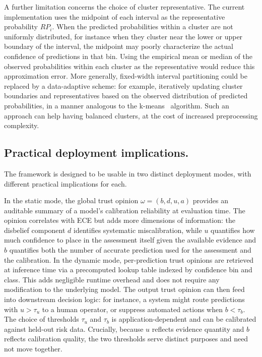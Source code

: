 A further limitation concerns the choice of cluster representative. The current implementation uses the midpoint of each interval as the representative probability $RP_i$. When the predicted probabilities within a cluster are not uniformly distributed, for instance when they cluster near the lower or upper boundary of the interval, the midpoint may poorly characterize the actual confidence of predictions in that bin. Using the empirical mean or median of the observed probabilities within each cluster as the representative would reduce this approximation error. More generally, fixed-width interval partitioning could be replaced by a data-adaptive scheme: for example, iteratively updating cluster boundaries and representatives based on the observed distribution of predicted probabilities, in a manner analogous to the k-means~\cite{kmeans8ddb7f85-9a8c-3829-b04e-0476a67eb0fd} algorithm. Such an approach can help having balanced clusters, at the cost of increased preprocessing complexity.

\subsection{Practical deployment implications.}
The framework is designed to be usable in two distinct deployment modes, with different practical implications for each.

In the static mode, the global trust opinion $\omega = (b, d, u, a)$ provides an auditable summary of a model's calibration reliability at evaluation time. The opinion correlates with \ac{ECE} but adds more dimensions of information: the disbelief component $d$ identifies systematic miscalibration, while $u$ quantifies how much confidence to place in the assessment itself given the available evidence and $b$ quantifies both the number of accurate prediction used for the assessment and the calibration. In the dynamic mode, per-prediction trust opinions are retrieved at inference time via a precomputed lookup table indexed by confidence bin and class. This adds negligible runtime overhead and does not require any modification to the underlying model. The output trust opinion can then feed into downstream decision logic: for instance, a system might route predictions with $u > \tau_u$ to a human operator, or suppress automated actions when $b < \tau_b$. The choice of thresholds $\tau_u$ and $\tau_b$ is application-dependent and can be calibrated against held-out risk data. Crucially, because $u$ reflects evidence quantity and $b$ reflects calibration quality, the two thresholds serve distinct purposes and need not move together.

